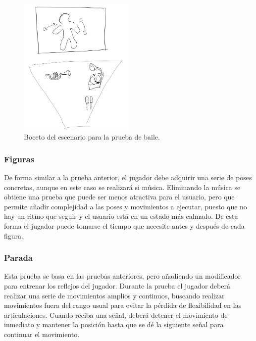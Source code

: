\begin{figure}
  \centering
    \includegraphics[width=0.5\textwidth]{03.EstudioProblema/02.AnalisisInicial/00.Figuras/02.baile.png}
    \caption{Boceto del escenario para la prueba de baile.}
    \label{fig:AI_baile}
\end{figure}

\subsubsection{Figuras}

De forma similar a la prueba anterior, el jugador debe adquirir una serie de poses concretas, aunque en este caso se realizará si música. Eliminando la música se obtiene una prueba que puede ser menos atractiva para el usuario, pero que permite añadir complejidad a las poses y movimientos a ejecutar, puesto que no hay un ritmo que seguir y el usuario está en un estado más calmado. De esta forma el jugador puede tomarse el tiempo que necesite antes y después de cada figura.


\subsubsection{Parada}

Esta prueba se basa en las pruebas anteriores, pero añadiendo un modificador para entrenar los reflejos del jugador. Durante la prueba el jugador deberá realizar una serie de movimientos amplios y continuos, buscando realizar movimientos fuera del rango usual para evitar la pérdida de flexibilidad en las articulaciones. Cuando reciba una señal, deberá detener el movimiento de inmediato y mantener la posición hasta que se dé la siguiente señal para continuar el movimiento.


